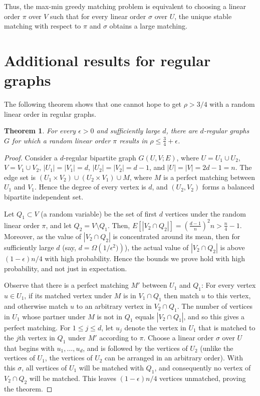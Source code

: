 \documentclass[11pt]{article}
\numberwithin{equation}{section}
\newtheorem{theorem}{Theorem}[section]
\theoremstyle{definition}
\theoremstyle{plain}
\theoremstyle{plain}
\begin{document}
%
Thus, the max-min greedy matching problem 
%
is equivalent to %
choosing a %
linear order $\pi$ over $V$ such that for every %
linear order $\sigma$ over $U$, the unique stable matching with respect to $\pi$ and $\sigma$ obtains a large matching.

%
%
%
%
%
%
%
%
%
%
%
%
%
%
%
%
%
%
%
%
%
%
%
%
%
%
%
%
%
%
%
%
%
%

%
%

\section{Additional results for regular graphs}
\label{sec:additional}

The following theorem shows that one cannot hope to get $\rho > 3/4$ with a random linear order in regular graphs.


%
\begin{theorem}
	\label{thm:3-4}
	For every $\epsilon > 0$ and sufficiently large $d$, there are $d$-regular graphs $G$ for which a random linear order $\pi$ results in $\rho \le \frac{3}{4} + \epsilon$.
\end{theorem}


\begin{proof}
	Consider a $d$-regular bipartite graph $G(U,V;E)$, where $U = U_1 \cup U_2$, $V = V_1 \cup V_2$,   $|U_1| = |V_1| = d$, $|U_2| = |V_2| = d-1$, and $|U| = |V| = 2d-1 = n$. The edge set is $(U_1 \times V_2) \cup (U_2 \times V_1) \cup M$, where $M$ is a perfect matching between $U_1$ and $V_1$. Hence the degree of every vertex is $d$, and $(U_2,V_2)$ forms 
	a balanced bipartite independent set.
	
	Let $Q_1 \subset V$ (a random variable) be the set of first $d$ vertices under the random linear order $\pi$, and let $Q_2 = V \setminus Q_1$. Then, $E[|V_2 \cap Q_2|] =  (\frac{d-1}{n})^2 n > \frac{n}{4} - 1$. Moreover, as the value of $|V_2 \cap Q_2|$ is concentrated around its mean, then for sufficiently large $d$ (say,
%
$d = \Omega\left(1/\epsilon^2)\right)$),    %
the actual value of $|V_2 \cap Q_2|$ is above 
%
$(1 - \epsilon)n/4$  %
with high probability. Hence the bounds we prove hold with high probability, and not just in expectation.
	
	Observe that there is a perfect matching $M'$ between $U_1$ and $Q_1$: For every vertex $u\in U_1$, if its matched vertex under $M$ is in $V_1 \cap Q_1$ then match $u$ to this vertex, and otherwise match $u$ to an arbitrary vertex in $V_2 \cap Q_1$. The number of vertices in $U_1$ whose partner under $M$ is not in $Q_1$ equals $|V_2 \cap Q_1|$, and so this gives a perfect matching. 
	For $1 \le j \le d$, let $u_j$ denote the vertex in $U_1$ that is matched to the $j$th vertex in $Q_1$ under $M'$ according to $\pi$. 
	Choose a linear order $\sigma$ over $U$ that begins with $u_1, \ldots, u_d$, and is followed by the vertices of $U_2$ (unlike the vertices of $U_1$, the vertices of $U_2$ can be arranged in an arbitrary order). With this $\sigma$, all vertices of $U_1$ will be matched with $Q_1$, and consequently no vertex of $V_2 \cap Q_2$ will be matched. This leaves
%
$(1 - \epsilon)n/4$   %
vertices unmatched, proving the theorem.
\end{proof}
\end{document}
